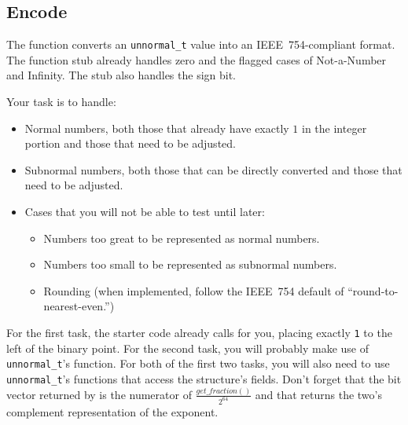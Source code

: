\subsection*{Encode}

The  function converts an \lstinline{unnormal_t} value into an IEEE~754-compliant format.
The function stub already handles zero and the flagged cases of Not-a-Number and Infinity.
The stub also handles the sign bit.

Your task is to handle:
\begin{itemize}
    \item Normal numbers, both those that already have exactly $1$ in the integer portion and those that need to be adjusted.
    \item Subnormal numbers, both those that can be directly converted and those that need to be adjusted.
    \item Cases that you will not be able to test until later:
    \begin{itemize}
        \item Numbers too great to be represented as normal numbers.
        \item Numbers too small to be represented as subnormal numbers.
        \item Rounding (when implemented, follow the IEEE~754 default of ``round-to-nearest-even.'')
    \end{itemize}
\end{itemize}

For the first task, the starter code already calls  for you, placing exactly \lstinline{1} to the left of the binary point.
For the second task, you will probably make use of \lstinline{unnormal_t}'s  function.
For both of the first two tasks, you will also need to use \lstinline{unnormal_t}'s functions that access the structure's fields.
Don't forget that the bit vector returned by  is the numerator of $\frac{get\_fraction()}{2^{64}}$ and that  returns the two's complement representation of the exponent.

